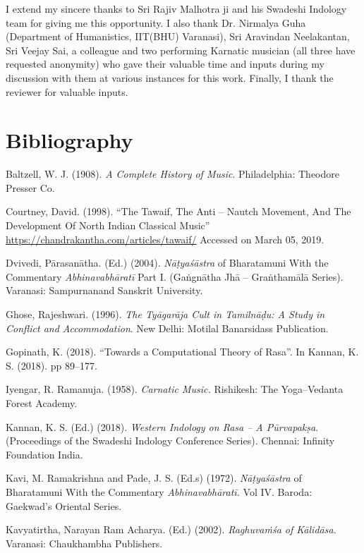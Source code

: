 I extend my sincere thanks to Sri Rajiv Malhotra ji and his Swadeshi Indology team for giving me this opportunity. I also thank Dr. Nirmalya Guha (Department of Humanistics, IIT(BHU) Varanasi), Sri Aravindan Neelakantan, Sri Veejay Sai, a colleague and two performing Karnatic musician (all three have requested anonymity) who gave their valuable time and inputs during my discussion with them at various instances for this work. Finally, I thank the reviewer for valuable inputs.


\section*{Bibliography}

\begin{thebibliography}{99}
 Baltzell, W. J. (1908). \textit{A Complete History of Music}. Philadelphia: Theodore Presser Co.

  Courtney, David. (1998). “The Tawaif, The Anti – Nautch Movement, And The Development Of North Indian Classical Music” \url{https://chandrakantha.com/articles/tawaif/} Accessed on March 05, 2019.

  Dvivedi, Pārasanātha. (Ed.) (2004). \textit{Nāṭyaśāstra} of Bharatamuni With the Commentary \textit{Abhinavabhāratī }Part I. (Gaṅgnātha Jhā – Graṅthamālā Series). Varanasi: Sampurnanand Sanskrit University.

  Ghose, Rajeshwari. (1996). \textit{The Tyāgarāja Cult in Tamilnāḍu: A Study in Conflict and Accommodation}. New Delhi: Motilal Banarsidass Publication.

  Gopinath, K. (2018). “Towards a Computational Theory of Rasa”. In Kannan, K. S. (2018). pp 89–177.

  Iyengar, R. Ramanuja. (1958). \textit{Carnatic Music.} Rishikesh: The Yoga–Vedanta Forest Academy.

  Kannan, K. S. (Ed.) (2018). \textit{Western Indology on Rasa – A Pūrvapakṣa}. (Proceedings of the Swadeshi Indology Conference Series). Chennai: Infinity Foundation India.

  Kavi, M. Ramakrishna and Pade, J. S. (Ed.s) (1972). \textit{Nāṭyaśāstra} of Bharatamuni With the Commentary \textit{Abhinavabhāratī. }Vol IV. Baroda: Gaekwad’s Oriental Series.

  Kavyatirtha, Narayan Ram Acharya. (Ed.) (2002). \textit{Raghuvaṁśa of Kālidāsa.} Varanasi: Chaukhambha Publishers.


\end{thebibliography}
